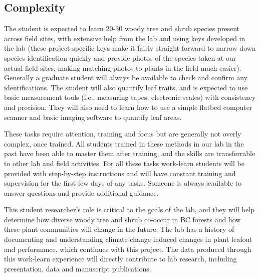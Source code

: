 \documentclass[11pt, oneside]{article}   	%
\begin{document}
\subsection {Complexity}

The student is expected to learn 20-30 woody tree and shrub species present across field sites, with extensive help from the lab and using keys developed in the lab (these project-specific keys make it fairly straight-forward to narrow down species identification quickly and provide photos of the species taken at our actual field sites, making matching photos to plants in the field much easier). Generally a graduate student will always be available to check and confirm any identifications. The student will also quantify leaf traits, and is expected to use basic measurement tools (i.e., measuring tapes, electronic scales) with consistency and precision. They will also need to learn how to use a simple flatbed computer scanner and basic imaging software to quantify leaf areas. 

These tasks require attention, training and focus but are generally not overly complex, once trained. All students trained in these methods in our lab in the past have been able to master them after training, and the skills are transferrable to other lab and field activities. For all these tasks work-learn students will be provided with step-by-step instructions and will have constant training and supervision for the first few days of any tasks. Someone is always available to answer questions and provide additional guidance. 

This student researcher's role is critical to the goals of the lab, and they will help determine how diverse woody tree and shrub co-occur in BC forests and how these plant communities will change in the future. The lab has a history of documenting and understanding climate-change induced changes in plant leafout and performance, which continues with this project. The data produced through this work-learn experience will directly contribute to lab research, including presentation, data and manuscript publications. 
\end{document}
